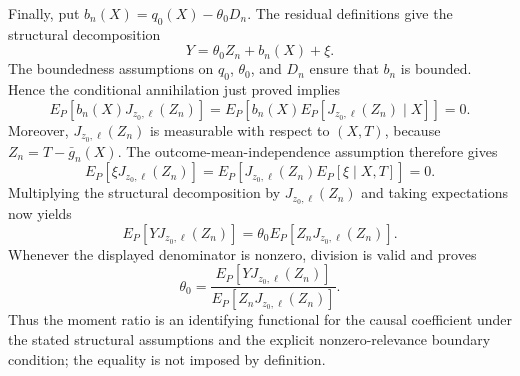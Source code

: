 Finally, put \(b_n(X)=q_0(X)-\theta_0D_n\).  The residual definitions give the structural decomposition
\[
Y=\theta_0Z_n+b_n(X)+\xi.
\]
The boundedness assumptions on \(q_0\), \(\theta_0\), and \(D_n\) ensure that \(b_n\) is bounded.  Hence the conditional annihilation just proved implies
\[
E_P[b_n(X)J_{z_0,\ell}(Z_n)]
=E_P\!\left[b_n(X)E_P[J_{z_0,\ell}(Z_n)\mid X]\right]
=0.
\]
Moreover, \(J_{z_0,\ell}(Z_n)\) is measurable with respect to \((X,T)\), because \(Z_n=T-\bar g_n(X)\).  The outcome-mean-independence assumption therefore gives
\[
E_P[\xi J_{z_0,\ell}(Z_n)]
=E_P\!\left[J_{z_0,\ell}(Z_n)E_P[\xi\mid X,T]\right]
=0.
\]
Multiplying the structural decomposition by \(J_{z_0,\ell}(Z_n)\) and taking expectations now yields
\[
E_P[YJ_{z_0,\ell}(Z_n)]
=\theta_0E_P[Z_nJ_{z_0,\ell}(Z_n)].
\]
Whenever the displayed denominator is nonzero, division is valid and proves
\[
\theta_0
=\frac{E_P[YJ_{z_0,\ell}(Z_n)]}
        {E_P[Z_nJ_{z_0,\ell}(Z_n)]}.
\]
Thus the moment ratio is an identifying functional for the causal coefficient under the stated structural assumptions and the explicit nonzero-relevance boundary condition; the equality is not imposed by definition.